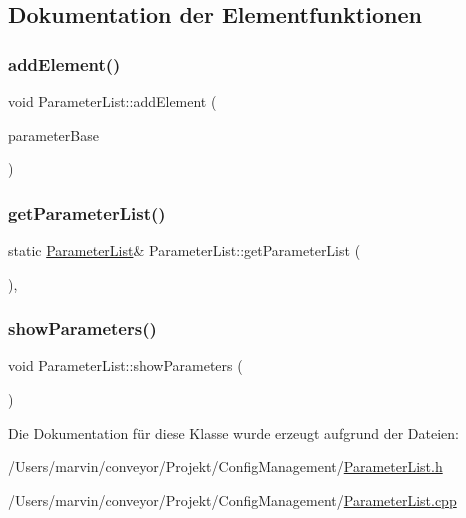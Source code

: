 \subsection{Dokumentation der Elementfunktionen}
\hypertarget{class_parameter_list_a4f4ede7252ae20641befa93cd6c316b3}{}\label{class_parameter_list_a4f4ede7252ae20641befa93cd6c316b3} 
\subsubsection{\texorpdfstring{add\+Element()}{addElement()}}
{\footnotesize\ttfamily void Parameter\+List\+::add\+Element (\begin{DoxyParamCaption}\item[{\hyperlink{class_parameter_base}{Parameter\+Base} $\ast$}]{parameter\+Base }\end{DoxyParamCaption})}

\hypertarget{class_parameter_list_ae34f5f9c5a2c8cf9ea216cc733a0a68b}{}\label{class_parameter_list_ae34f5f9c5a2c8cf9ea216cc733a0a68b} 
\subsubsection{\texorpdfstring{get\+Parameter\+List()}{getParameterList()}}
{\footnotesize\ttfamily static \hyperlink{class_parameter_list}{Parameter\+List}\& Parameter\+List\+::get\+Parameter\+List (\begin{DoxyParamCaption}{ }\end{DoxyParamCaption})\hspace{0.3cm}{\ttfamily [inline]}, {\ttfamily [static]}}

\hypertarget{class_parameter_list_a8402f42970e27ac8618733f507178788}{}\label{class_parameter_list_a8402f42970e27ac8618733f507178788} 
\subsubsection{\texorpdfstring{show\+Parameters()}{showParameters()}}
{\footnotesize\ttfamily void Parameter\+List\+::show\+Parameters (\begin{DoxyParamCaption}{ }\end{DoxyParamCaption})}



Die Dokumentation für diese Klasse wurde erzeugt aufgrund der Dateien\+:\begin{DoxyCompactItemize}
\item 
/\+Users/marvin/conveyor/\+Projekt/\+Config\+Management/\hyperlink{_parameter_list_8h}{Parameter\+List.\+h}\item 
/\+Users/marvin/conveyor/\+Projekt/\+Config\+Management/\hyperlink{_parameter_list_8cpp}{Parameter\+List.\+cpp}\end{DoxyCompactItemize}

